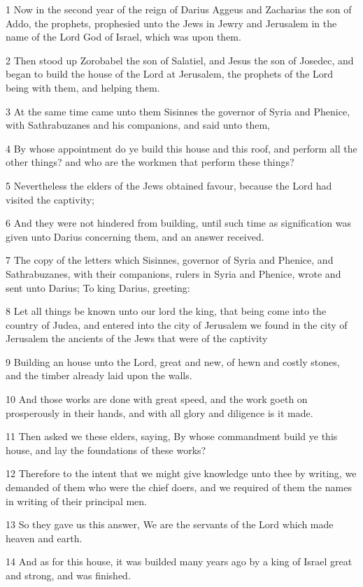 \par 1 Now in the second year of the reign of Darius Aggeus and Zacharias the son of Addo, the prophets, prophesied unto the Jews in Jewry and Jerusalem in the name of the Lord God of Israel, which was upon them.
\par 2 Then stood up Zorobabel the son of Salatiel, and Jesus the son of Josedec, and began to build the house of the Lord at Jerusalem, the prophets of the Lord being with them, and helping them.
\par 3 At the same time came unto them Sisinnes the governor of Syria and Phenice, with Sathrabuzanes and his companions, and said unto them,
\par 4 By whose appointment do ye build this house and this roof, and perform all the other things? and who are the workmen that perform these things?
\par 5 Nevertheless the elders of the Jews obtained favour, because the Lord had visited the captivity;
\par 6 And they were not hindered from building, until such time as signification was given unto Darius concerning them, and an answer received.
\par 7 The copy of the letters which Sisinnes, governor of Syria and Phenice, and Sathrabuzanes, with their companions, rulers in Syria and Phenice, wrote and sent unto Darius; To king Darius, greeting:
\par 8 Let all things be known unto our lord the king, that being come into the country of Judea, and entered into the city of Jerusalem we found in the city of Jerusalem the ancients of the Jews that were of the captivity
\par 9 Building an house unto the Lord, great and new, of hewn and costly stones, and the timber already laid upon the walls.
\par 10 And those works are done with great speed, and the work goeth on prosperously in their hands, and with all glory and diligence is it made.
\par 11 Then asked we these elders, saying, By whose commandment build ye this house, and lay the foundations of these works?
\par 12 Therefore to the intent that we might give knowledge unto thee by writing, we demanded of them who were the chief doers, and we required of them the names in writing of their principal men.
\par 13 So they gave us this answer, We are the servants of the Lord which made heaven and earth.
\par 14 And as for this house, it was builded many years ago by a king of Israel great and strong, and was finished.
